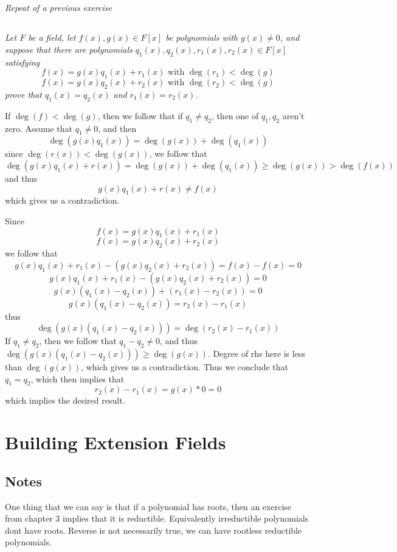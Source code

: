 \documentclass[11pt,oneside,titlepage]{book}
\begin{document}
\subsection{}

\textit{Repeat of a previous exercise}

\subsection{}

\textit{Let $F$ be a field, let $f(x), g(x) \in F[x]$ be polynomials
with $g(x) \neq 0$, and suppose that there are polynomials $q_1(x),
q_2(x), r_1(x), r_2(x) \in F[x]$ satisfying
$$f(x) = g(x) q_1(x) + r_1(x)\text{ with } \deg(r_1) < \deg(g)$$
$$f(x) = g(x) q_2(x) + r_2(x)\text{ with } \deg(r_2) < \deg(g)$$
prove that $q_1(x) = q_2(x)$ and $r_1(x) = r_2(x)$. }

If $\deg(f) < \deg(g)$, then we follow that if $q_1 \neq q_2$, then one of
$q_1, q_2$ aren't zero. Assume that $q_1 \neq 0$, and then
$$\deg(g(x)q_1(x)) = \deg(g(x)) + \deg(q_1(x))$$
since $\deg(r(x)) < \deg(g(x))$, we follow that
$$\deg(g(x)q_1(x) + r(x)) = \deg(g(x)) + \deg(q_1(x)) \geq \deg(g(x)) > \deg(f(x))$$
and thus
$$g(x)q_1(x) + r(x) \neq f(x)$$
which gives us a contradiction.

Since
$$f(x) = g(x) q_1(x) + r_1(x)$$
$$f(x) = g(x) q_2(x) + r_2(x)$$
we follow that
$$g(x) q_1(x) + r_1(x) - (g(x) q_2(x) + r_2(x)) = f(x) - f(x) = 0$$
$$g(x) q_1(x) + r_1(x) - (g(x) q_2(x) + r_2(x))  = 0$$
$$g(x) (q_1(x) - q_2(x)) + (r_1(x) -  r_2(x))  = 0$$
$$g(x) (q_1(x) - q_2(x)) = r_2(x) - r_1(x)$$
thus
$$\deg(g(x) (q_1(x) - q_2(x))) = \deg(r_2(x) - r_1(x))$$
If $q_1 \neq q_2$, then we follow that  $q_1 - q_2 \neq 0$, and thus
$\deg(g(x) (q_1(x) - q_2(x))) \geq \deg(g(x))$. Degree of rhs here is
less than $\deg(g(x))$, which gives us a contradiction. Thus we
conclude that $q_1 = q_2$, which then implies that
$$r_2(x) - r_1(x) = g(x) * 0 = 0$$
which implies the desired result.

\section{Building Extension Fields}

\subsection*{Notes}

One thing that we can say is that if a polynomial has roots,
then an exercise from chapter 3 implies that it is reductible.
Equivalently irreductible polynomials dont have roots.
Reverse is not necessarily true, we can have rootless reductible
polynomials.
\end{document}
